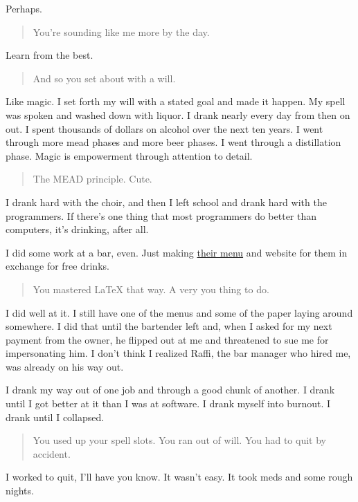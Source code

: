 Perhaps.

\begin{quote}
You're sounding like me more by the day.
\end{quote}

Learn from the best.

\begin{quote}
And so you set about with a will.
\end{quote}

Like magic. I set forth my will with a stated goal and made it happen. My spell was spoken and washed down with liquor. I drank nearly every day from then on out. I spent thousands of dollars on alcohol over the next ten years. I went through more mead phases and more beer phases. I went through a distillation phase. Magic is empowerment through attention to detail.

\begin{quote}
The MEAD principle. Cute.
\end{quote}

I drank hard with the choir, and then I left school and drank hard with the programmers. If there's one thing that most programmers do better than computers, it's drinking, after all.

I did some work at a bar, even. Just making \href{/emb-menu.pdf}{their menu} and website for them in exchange for free drinks.

\begin{quote}
You mastered LaTeX that way. A very you thing to do.
\end{quote}

I did well at it. I still have one of the menus and some of the paper laying around somewhere. I did that until the bartender left and, when I asked for my next payment from the owner, he flipped out at me and threatened to sue me for impersonating him. I don't think I realized Raffi, the bar manager who hired me, was already on his way out.

I drank my way out of one job and through a good chunk of another. I drank until I got better at it than I was at software. I drank myself into burnout. I drank until I collapsed.

\begin{quote}
You used up your spell slots. You ran out of will. You had to quit by accident.
\end{quote}

I worked to quit, I'll have you know. It wasn't easy. It took meds and some rough nights.

